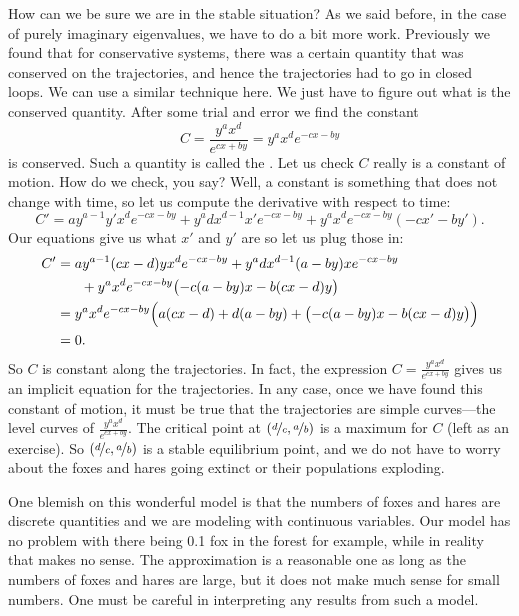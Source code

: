 How can we be sure we are in the stable situation?
As we said before, in the case of purely imaginary eigenvalues, we have to
do a bit more work.  Previously we found that for conservative systems,
there was a certain quantity that was conserved on the trajectories, and
hence the trajectories had to go in closed loops.
We can use a similar technique here.  We just have to figure out what is the
conserved quantity.  After some trial and error we find the
constant
\begin{equation*}
C = \frac{y^a x^d}{e^{cx+by}} = y^a x^d e^{-cx-by}
\end{equation*}
is conserved.  Such a quantity is called the \emph{}.  Let us check $C$ really is a constant of motion.  How do we check, you say?  Well, a constant is
something that does not change with time, so let us compute the derivative
with respect to time:
\begin{equation*}
C' = 
a y^{a-1}y' x^d e^{-cx-by}
+
y^a d x^{d-1} x' e^{-cx-by}
+
y^a x^d e^{-cx-by} (-cx'-by') .
\end{equation*}
Our equations give us what $x'$ and $y'$ are so let us plug those in:
\begin{equation*}
\begin{split}
C' & = 
a y^{a-1} (cx-d)y x^d e^{-cx-by}
+
y^a d x^{d-1} (a-by)x e^{-cx-by}
\\
& \phantom{mm} +
y^a x^d e^{-cx-by} \bigl(-c(a-by)x-b(cx-d)y\bigr)
\\
& =
y^a x^d e^{-cx-by}
\Bigl(
a (cx-d)
+
d (a-by)
+
\bigl(-c(a-by)x-b(cx-d)y\bigr) \Bigr)
\\
& = 
0 .
\end{split}
\end{equation*}
So $C$ is constant along the trajectories.  In fact, the expression $C =
\frac{y^a x^d}{e^{cx+by}}$ gives us an implicit equation for the
trajectories.  In any case, once we have found this constant of motion,
it must be true that the
trajectories are simple curves---the level curves of
$\frac{y^a x^d}{e^{cx+by}}$.  The critical point at
$(\nicefrac{d}{c},\nicefrac{a}{b})$ is a maximum for $C$ (left as an exercise).
So $(\nicefrac{d}{c},\nicefrac{a}{b})$ is a stable equilibrium point, and 
we do not have to worry about the foxes and hares going extinct or their
populations exploding.

One blemish on this wonderful model is that the numbers of foxes and hares
are discrete quantities and we are modeling with continuous variables.  Our
model has no problem with there being 0.1 fox in the forest for example,
while in reality that makes no sense.  The approximation is a reasonable one
as long as the numbers of foxes and hares are large, but it does not make
much sense for small numbers.  One must be careful in interpreting any
results from such a model.


